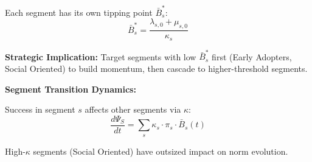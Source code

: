 \begin{tcolorbox}[colback=red!5!white, colframe=red!75!black,
    title=\textbf{Integration UNTCM-I4: Segment Heterogeneity}]
Each segment has its own tipping point $\bar{B}_s^*$:
\begin{equation}
\bar{B}_s^* = \frac{\lambda_{s,0} + \mu_{s,0}}{\kappa_s}
\end{equation}

\textbf{Strategic Implication:} Target segments with low $\bar{B}_s^*$ first (Early Adopters, Social Oriented) to build momentum, then cascade to higher-threshold segments.

\textbf{Segment Transition Dynamics:}

Success in segment $s$ affects other segments via $\kappa$:
\begin{equation}
\frac{d\Psi_S}{dt} = \sum_{s} \kappa_s \cdot \pi_s \cdot \bar{B}_s(t)
\end{equation}

High-$\kappa$ segments (Social Oriented) have outsized impact on norm evolution.

\end{tcolorbox}

